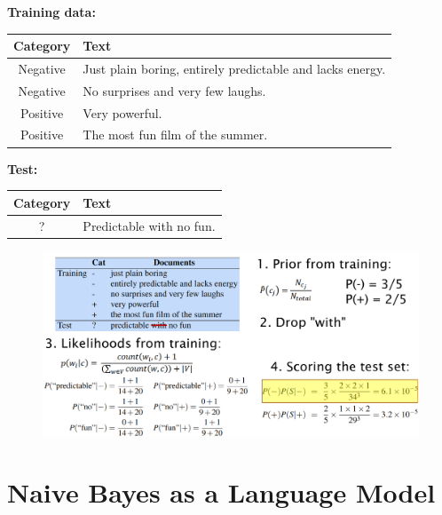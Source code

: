 \textbf{Training data:} 

\begin{table}[h]
\centering
\begin{tabular}{|c|p{}|}
\hline
\textbf{Category} & \textbf{Text} \\
\hline
Negative & Just plain boring, entirely predictable and lacks energy. \\
\hline
Negative & No surprises and very few laughs. \\
\hline
Positive & Very powerful. \\
\hline
Positive & The most fun film of the summer. \\
\hline
\end{tabular}
\end{table}


\textbf{Test:} 
\begin{table}[h]
\centering
\begin{tabular}{|c|p{}|}
\hline
\textbf{Category} & \textbf{Text} \\
\hline
? & Predictable with no fun. \\
\hline
\end{tabular}
\end{table}

\begin{figure}[h]
\includegraphics[scale = 0.23]{pics/naive_example.png}
\end{figure}


\section{Naive Bayes as a Language Model}

